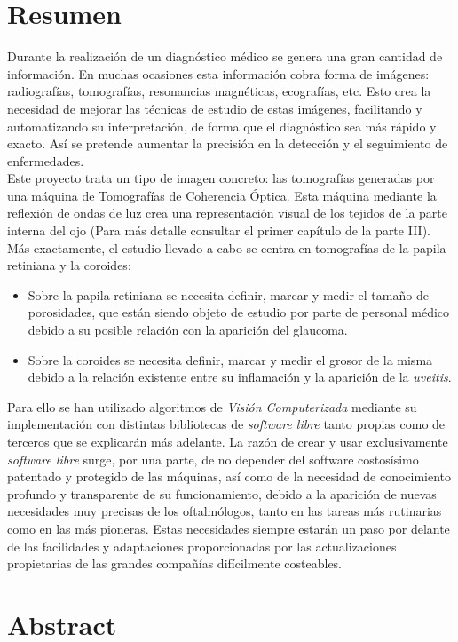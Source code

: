 \section*{Resumen}
Durante la realización de un diagnóstico médico se genera una gran
cantidad de información. En muchas ocasiones esta información cobra
forma de imágenes: radiografías, tomografías, resonancias magnéticas,
ecografías, etc. Esto crea la necesidad de mejorar las técnicas de
estudio de estas imágenes, facilitando y automatizando su
interpretación, de forma que el diagnóstico sea más rápido y
exacto. Así se pretende aumentar la precisión en la detección y el
seguimiento de enfermedades.\\
Este proyecto trata un tipo de imagen concreto: las tomografías
generadas por una máquina de Tomografías de Coherencia Óptica. Esta
máquina mediante la reflexión de ondas de luz crea una representación
visual de los tejidos de la parte interna del ojo (Para más detalle
consultar el primer capítulo de la parte III). Más exactamente, el
estudio llevado a cabo se centra en tomografías de la papila retiniana
y la coroides:
\begin{itemize}
\item Sobre la papila retiniana se necesita definir, marcar y medir el
  tamaño de porosidades, que están siendo objeto de estudio por parte
  de personal médico debido a su posible relación con la aparición del
  glaucoma.
\item Sobre la coroides se necesita definir, marcar y medir el grosor
  de la misma debido a la relación existente entre su inflamación y la
  aparición de la \emph{uveitis}.
\end{itemize}
Para ello se han utilizado algoritmos de \emph{Visión Computerizada}
mediante su implementación con distintas bibliotecas de \emph{software
  libre} tanto propias como de terceros que se explicarán más
adelante. La razón de crear y usar exclusivamente \emph{software
  libre} surge, por una parte, de no depender del software costosísimo
patentado y protegido de las máquinas, así como de la necesidad de
conocimiento profundo y transparente de su funcionamiento, debido a la
aparición de nuevas necesidades muy precisas de los oftalmólogos,
tanto en las tareas más rutinarias como en las más pioneras. Estas
necesidades siempre estarán un paso por delante de las facilidades y
adaptaciones proporcionadas por las actualizaciones propietarias de
las grandes compañías difícilmente costeables.
\newpage
\section*{Abstract}

